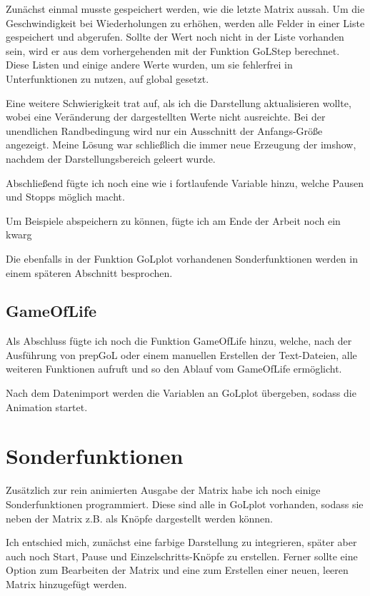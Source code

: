 \documentclass{scrartcl}
\begin{document}
Zunächst einmal musste gespeichert werden, wie die letzte  Matrix aussah. Um die Geschwindigkeit bei Wiederholungen zu erhöhen, werden alle Felder in einer Liste gespeichert und abgerufen. Sollte der Wert noch nicht in der Liste vorhanden sein, wird er aus dem vorhergehenden mit der Funktion GoLStep berechnet. Diese Listen und einige andere Werte wurden, um sie fehlerfrei in Unterfunktionen zu nutzen, auf global gesetzt.

Eine weitere Schwierigkeit trat auf, als ich die Darstellung aktualisieren wollte, wobei eine Veränderung der dargestellten Werte nicht ausreichte. Bei der unendlichen Randbedingung wird nur ein Ausschnitt der Anfangs-Größe angezeigt. Meine Lösung war schließlich die immer neue Erzeugung der imshow, nachdem der Darstellungsbereich geleert wurde.

Abschließend fügte ich noch eine wie i fortlaufende Variable hinzu, welche Pausen und Stopps möglich macht.

Um Beispiele abspeichern zu können, fügte ich am Ende der Arbeit noch ein kwarg 

Die ebenfalls in der Funktion GoLplot vorhandenen Sonderfunktionen werden in einem späteren Abschnitt besprochen.

\subsection{GameOfLife}
Als Abschluss fügte ich noch die Funktion GameOfLife hinzu, welche, nach der Ausführung von prepGoL oder einem manuellen Erstellen der Text-Dateien, alle weiteren Funktionen aufruft und so den Ablauf vom GameOfLife ermöglicht.

Nach dem Datenimport werden die Variablen an GoLplot übergeben, sodass die Animation startet.

\section{Sonderfunktionen}
Zusätzlich zur rein animierten Ausgabe der Matrix habe ich noch einige Sonderfunktionen programmiert. Diese sind alle in GoLplot vorhanden, sodass sie neben der Matrix z.B. als Knöpfe dargestellt werden können.

Ich entschied mich, zunächst eine farbige Darstellung zu integrieren, später aber auch noch Start, Pause und Einzelschritts-Knöpfe zu erstellen. Ferner sollte eine Option zum Bearbeiten der Matrix und eine zum Erstellen einer neuen, leeren Matrix hinzugefügt werden.
\end{document}
